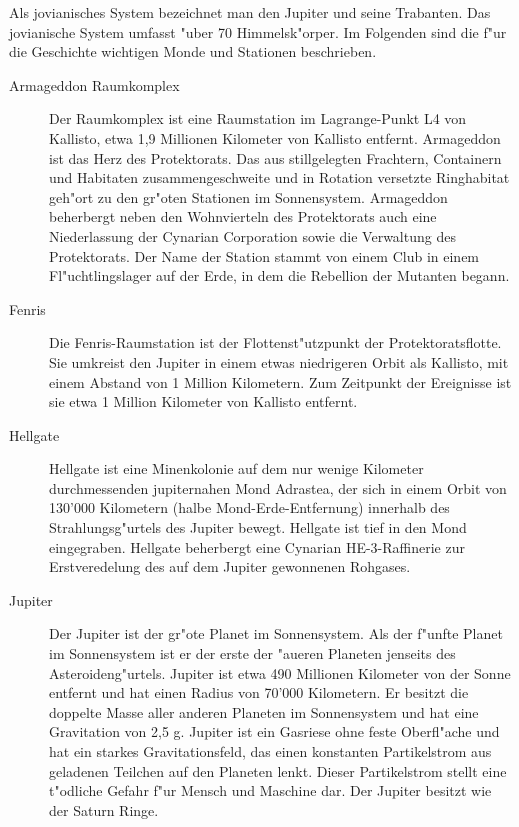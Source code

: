 
Als jovianisches System bezeichnet man den Jupiter und seine Trabanten. Das jovianische System umfasst "uber 70 Himmelsk"orper. Im Folgenden sind die f"ur die Geschichte wichtigen Monde und Stationen beschrieben.

\begin{description}
\item [Armageddon Raumkomplex] Der Raumkomplex ist eine Raumstation im Lagrange-Punkt L4 von Kallisto, etwa 1,9 Millionen Kilometer von 
      Kallisto entfernt. Armageddon ist das Herz des Protektorats. Das aus stillgelegten Frachtern, Containern und Habitaten zusammengeschwei\3te und in Rotation versetzte Ringhabitat geh"ort zu den gr"o\3ten Stationen im Sonnensystem. Armageddon beherbergt neben den Wohnvierteln des Protektorats auch eine Niederlassung der Cynarian Corporation sowie die Verwaltung des Protektorats. Der Name der Station stammt von einem Club in einem Fl"uchtlingslager auf der Erde, in dem die Rebellion der Mutanten begann.
\item [Fenris] Die Fenris-Raumstation ist der Flottenst"utzpunkt der Protektoratsflotte. Sie umkreist den Jupiter in einem etwas niedrigeren 
      Orbit als Kallisto, mit einem Abstand von 1 Million Kilometern. Zum Zeitpunkt der Ereignisse ist sie etwa 1 Million Kilometer von Kallisto entfernt.
\item [Hellgate] Hellgate ist eine Minenkolonie auf dem nur wenige Kilometer durchmessenden jupiternahen Mond Adrastea, der sich in einem 
      Orbit von 130'000 Kilometern (halbe Mond-Erde-Entfernung) innerhalb des Strahlungsg"urtels des Jupiter bewegt. Hellgate ist tief in den Mond eingegraben. Hellgate beherbergt eine Cynarian HE-3-Raffinerie zur Erstveredelung des auf dem Jupiter gewonnenen Rohgases. 
\item [Jupiter] Der Jupiter ist der gr"o\3te Planet im Sonnensystem. Als der f"unfte Planet im Sonnensystem ist er der erste der "au\3eren 
      Planeten jenseits des Asteroideng"urtels. Jupiter ist etwa 490 Millionen Kilometer von der Sonne entfernt und hat einen Radius von 70'000 Kilometern. Er besitzt die doppelte Masse aller anderen Planeten im Sonnensystem und hat eine Gravitation von 2,5 g. Jupiter ist ein Gasriese ohne feste Oberfl"ache und hat ein starkes Gravitationsfeld, das einen konstanten Partikelstrom aus geladenen Teilchen auf den Planeten lenkt. Dieser Partikelstrom stellt eine t"odliche Gefahr f"ur Mensch und Maschine dar. Der Jupiter besitzt wie der Saturn Ringe.

\end{description}
